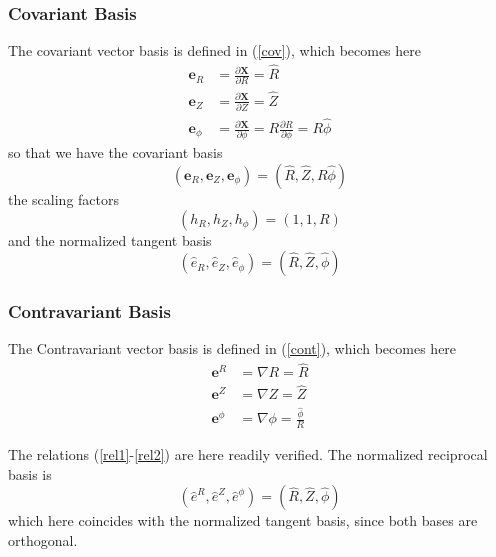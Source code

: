 \subsubsection{Covariant Basis}

The covariant vector basis is defined in (\ref{cov}), which becomes here 
\begin{align}
\mathbf{e}_{R} & =\frac{\partial\mathbf{X}}{\partial R}=\widehat{R} \\
\mathbf{e}_{Z} & =\frac{\partial\mathbf{X}}{\partial Z}=\widehat{Z} \\
\mathbf{e}_{\phi} & =\frac{\partial\mathbf{X}}{\partial\phi}=R\frac {\partial%
\widehat{R}}{\partial\phi}=R\widehat{\phi}
\end{align}
so that we have the covariant basis 
\begin{equation}
\left( \mathbf{e}_{R},\mathbf{e}_{Z},\mathbf{e}_{\phi}\right) =\left( 
\widehat{R},\widehat{Z},R\widehat{\phi}\right)
\end{equation}
the scaling factors 
\begin{equation}
\left( h_{R},h_{Z},h_{\phi}\right) =\left( 1,1,R\right)
\end{equation}
and the normalized tangent basis 
\begin{equation}
\left( \widehat{e}_{R},\widehat{e}_{Z},\widehat{e}_{\phi}\right) =\left( 
\widehat{R},\widehat{Z},\widehat{\phi}\right)
\end{equation}

\subsubsection{Contravariant Basis}

The Contravariant vector basis is defined in (\ref{cont}), which becomes
here 
\begin{align}
\mathbf{e}^{R} & =\nabla R=\widehat{R} \\
\mathbf{e}^{Z} & =\nabla Z=\widehat{Z} \\
\mathbf{e}^{\phi} & =\nabla\phi=\frac{\widehat{\phi}}{R}
\end{align}

The relations (\ref{rel1}-\ref{rel2}) are here readily verified. The
normalized reciprocal basis is 
\begin{equation}
\left( \widehat{e}^{R},\widehat{e}^{Z},\widehat{e}^{\phi}\right) =\left( 
\widehat{R},\widehat{Z},\widehat{\phi}\right)
\end{equation}
which here coincides with the normalized tangent basis, since both bases are
orthogonal.

